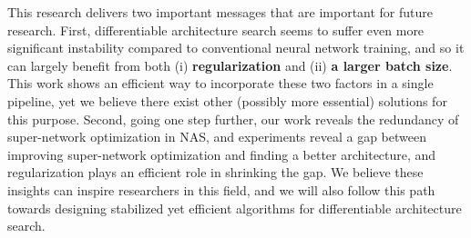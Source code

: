 \documentclass{article} \usepackage{iclr2020_conference,times}
\begin{document}
This research delivers two important messages that are important for future research. First, differentiable architecture search seems to suffer even more significant instability compared to conventional neural network training, and so it can largely benefit from both (i) \textbf{regularization} and (ii) \textbf{a larger batch size}. This work shows an efficient way to incorporate these two factors in a single pipeline, yet we believe there exist other (possibly more essential) solutions for this purpose. Second, going one step further, our work reveals the redundancy of super-network optimization in NAS, and experiments reveal a gap between improving super-network optimization and finding a better architecture, and regularization plays an efficient role in shrinking the gap. We believe these insights can inspire researchers in this field, and we will also follow this path towards designing stabilized yet efficient algorithms for differentiable architecture search.







\iffalse
\appendix
\section{Appendix}
\textcolor{red}{
\subsection{FLOPs Constraint}
Despite the performance of the searched architecture, we also consider about its computation complexity (FLOPs). Such constraint during search phase can be reflected as a FLOPs regularizer in the loss function. 
\begin{equation}\label{loss-FLOPs}
    \mathcal{L}(\alpha,\beta,\omega)=\mathcal{L}_{CE}+\eta\mathcal{L}_{FLOPs}
\end{equation}
where $\mathcal{L}_{CE}$ is the cross-entrophy loss of the training of the supernet, $\mathcal{L}_{FLOPs}$ is the FLOPs regularizer:
\begin{equation}\label{FLOPs}
    \mathcal{L}_{FLOPs}=\sum_{i,j}\alpha^T_{i,j}F(\mathcal{O})
\end{equation}
$F(\mathcal{O})$ contains FLOPs of operations in $\mathcal{O}$
}
\fi
\end{document}
